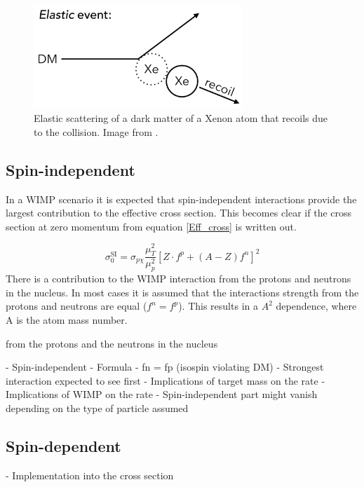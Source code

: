 \documentclass{article}
\begin{document}
\begin{figure}[h]
    \centering
    \includegraphics[width=0.7\textwidth]{Elastic_Scattering.png}
    \caption{Elastic scattering of a dark matter of a Xenon atom that recoils due to the collision. Image from \cite{McCabe:2015eia}.}
\end{figure}


\subsection{Spin-independent}

In a WIMP scenario it is expected that spin-independent interactions provide the largest contribution to the effective cross section. This becomes clear if the cross section at zero momentum from equation \ref{Eff_cross} is written out. 

\begin{equation}
    \sigma^\text{SI}_0 = \sigma_{p \chi} \frac{\mu_T^2}{\mu_p^2} \left[Z \cdot f^p + (A-Z) f^n \right]^2
\end{equation}
There is a contribution to the WIMP interaction from the protons and neutrons in the nucleus. In most cases it is assumed that the interactions strength from the protons and neutrons are equal ($f^n = f^p$). This results in a $A^2$ dependence, where A is the atom mass number. 

from the protons and the neutrons in the nucleus 

- Spin-independent
    - Formula
    - fn = fp (isospin violating DM)
    - Strongest interaction expected to see first
    - Implications of target mass on the rate
    - Implications of WIMP on the rate
    - Spin-independent part might vanish depending on the type of particle assumed \cite{Lewin:1995rx}


\subsection{Spin-dependent}

- Implementation into the cross section
\end{document}
